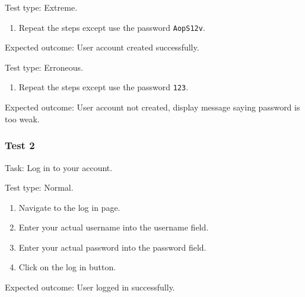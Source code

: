 {\color{gray} \hrulefill}

{\sffamily Test type: Extreme.}\\ 

\begin{enumerate}
\item Repeat the steps except use the password \texttt{AopS12v}.\\ 
\end{enumerate}

{\sffamily Expected outcome:} User account created successfully.\\ 

{\color{gray} \hrulefill}

{\sffamily Test type: Erroneous.} \\ 

\begin{enumerate}
\item Repeat the steps except use the password \texttt{123}.  
\end{enumerate}

{\sffamily Expected outcome:} User account not created, display 
message saying password is too weak.\\

{\color{gray} \hrulefill}

\vspace{0.2cm}

\subsubsection{Test 2}

{\sffamily Task:} Log in to your account.\\ 

{\color{gray} \hrulefill}

{\sffamily Test type: Normal.}\\

\begin{enumerate}
  \item Navigate to the log in page.
  \item Enter your actual username into the username field.
  \item Enter your actual password into the password field.
  \item Click on the log in button.
\end{enumerate}

{\sffamily Expected outcome:} User logged in successfully. \\ 

